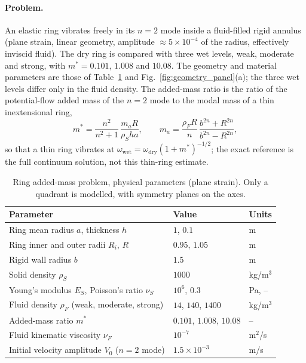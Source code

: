 \paragraph{Problem.}
An elastic ring vibrates freely in its $n=2$ mode inside a fluid-filled rigid annulus (plane strain, linear geometry, amplitude $\approx5\times10^{-4}$ of the radius, effectively inviscid fluid).
The dry ring is compared with three wet levels, weak, moderate and strong, with $m^* = 0.101$, $1.008$ and $10.08$.
The geometry and material parameters are those of Table~\ref{tab:ring_params} and Fig.~\ref{fig:geometry_panel}(a); the three wet levels differ only in the fluid density.
The added-mass ratio is the ratio of the potential-flow added mass of the $n=2$ mode to the modal mass of a thin inextensional ring,
\begin{equation}
m^* = \frac{n^2}{n^2+1}\,\frac{m_a R}{\rho_S h a},
\qquad
m_a = \frac{\rho_F R}{n}\,\frac{b^{2n}+R^{2n}}{b^{2n}-R^{2n}},
\end{equation}
so that a thin ring vibrates at $\omega_{\mathrm{wet}} = \omega_{\mathrm{dry}}(1+m^*)^{-1/2}$; the exact reference is the full continuum solution, not this thin-ring estimate.
\begin{table}[htbp]
	\centering
	\small
	\caption{Ring added-mass problem, physical parameters (plane strain). Only a quadrant is modelled, with symmetry planes on the axes.}
	\label{tab:ring_params}
	\begin{tabular}{lll}
		\toprule
		Parameter & Value & Units \\
		\midrule
		Ring mean radius $a$, thickness $h$ & $1$, $0.1$ & m \\
		Ring inner and outer radii $R_i$, $R$ & $0.95$, $1.05$ & m \\
		Rigid wall radius $b$ & $1.5$ & m \\
		Solid density $\rho_S$ & $1000$ & kg/m$^3$ \\
		Young's modulus $E_S$, Poisson's ratio $\nu_S$ & $10^{6}$, $0.3$ & Pa, -- \\
		Fluid density $\rho_F$ (weak, moderate, strong) & $14$, $140$, $1400$ & kg/m$^3$ \\
		Added-mass ratio $m^*$ & $0.101$, $1.008$, $10.08$ & -- \\
		Fluid kinematic viscosity $\nu_F$ & $10^{-7}$ & m$^2$/s \\
		Initial velocity amplitude $V_0$ ($n=2$ mode) & $1.5\times10^{-3}$ & m/s \\
		\bottomrule
	\end{tabular}
\end{table}

